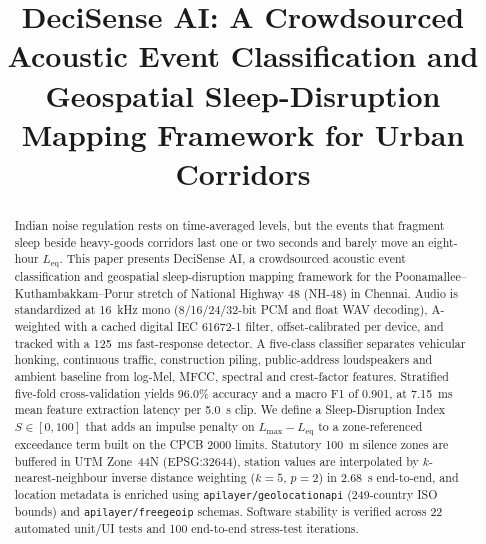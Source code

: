 \documentclass[conference]{IEEEtran}
\newcommand{\Leq}{L_{\text{eq}}}
\newcommand{\Lmax}{L_{\max}}
\begin{document}
\title{DeciSense AI: A Crowdsourced Acoustic Event Classification and Geospatial Sleep-Disruption Mapping Framework for Urban Corridors}

\author{%
}

\maketitle

\begin{abstract}
Indian noise regulation rests on time-averaged levels, but the events that fragment sleep beside heavy-goods corridors last one or two seconds and barely move an eight-hour $\Leq$. This paper presents DeciSense AI, a crowdsourced acoustic event classification and geospatial sleep-disruption mapping framework for the Poonamallee--Kuthambakkam--Porur stretch of National Highway 48 (NH-48) in Chennai. Audio is standardized at 16~kHz mono (8/16/24/32-bit PCM and float WAV decoding), A-weighted with a cached digital IEC 61672-1 filter, offset-calibrated per device, and tracked with a 125~ms fast-response detector. A five-class classifier separates vehicular honking, continuous traffic, construction piling, public-address loudspeakers and ambient baseline from log-Mel, MFCC, spectral and crest-factor features. Stratified five-fold cross-validation yields 96.0\% accuracy and a macro F1 of 0.901, at 7.15~ms mean feature extraction latency per 5.0~s clip. We define a Sleep-Disruption Index $S\in[0,100]$ that adds an impulse penalty on $\Lmax-\Leq$ to a zone-referenced exceedance term built on the CPCB 2000 limits. Statutory 100~m silence zones are buffered in UTM Zone~44N (EPSG:32644), station values are interpolated by $k$-nearest-neighbour inverse distance weighting ($k=5$, $p=2$) in 2.68~s end-to-end, and location metadata is enriched using \texttt{apilayer/geolocationapi} (249-country ISO bounds) and \texttt{apilayer/freegeoip} schemas. Software stability is verified across 22 automated unit/UI tests and 100 end-to-end stress-test iterations.
\end{abstract}
\end{document}
